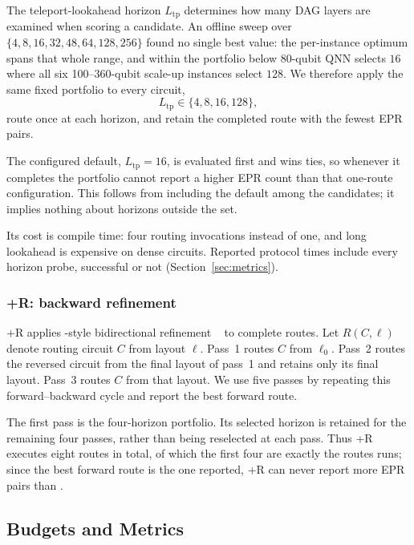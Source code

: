 The teleport-lookahead horizon $L_\mathrm{tp}$ determines how many DAG
layers are examined when scoring a \TeleData{} candidate. An offline sweep
over $\{4,8,16,32,48,64,128,256\}$ found no single best value: the
per-instance optimum spans that whole range, and within the portfolio below
80-qubit QNN selects $16$ where all six 100--360-qubit scale-up instances
select $128$. We therefore apply the same
fixed portfolio to every circuit,
\[
L_\mathrm{tp}\in\{4,8,16,128\},
\]
route once at each horizon, and retain the completed route with the fewest
EPR pairs.

The configured default, $L_\mathrm{tp}=16$, is evaluated first and wins
ties, so whenever it completes the portfolio cannot report a higher EPR
count than that one-route configuration. This follows from including the
default among the candidates; it implies nothing about horizons outside the
set.

Its cost is compile time: four routing invocations instead of one, and long
lookahead is expensive on dense circuits. Reported protocol times include
every horizon probe, successful or not (Section~\ref{sec:metrics}).

\subsubsection{\PORTER{}+R: backward refinement}
\label{sec:sfc-refine}

\PORTER{}+R applies \SABRE{}-style bidirectional refinement
~\cite{li2019tackling} to complete routes. Let $R(C,\ell)$ denote routing
circuit $C$ from layout $\ell$. Pass~1 routes $C$ from $\ell_0$. Pass~2
routes the reversed circuit from the final layout of pass~1 and retains only
its final layout. Pass~3 routes $C$ from that layout. We use five passes by
repeating this forward--backward cycle and report the best forward route.

The first pass is the four-horizon \PORTER{} portfolio. Its selected horizon
is retained for the remaining four passes, rather than being reselected at
each pass. Thus \PORTER{}+R executes eight routes in total, of which the first four
are exactly the routes \PORTER{} runs; since the best forward route is the
one reported, \PORTER{}+R can never report more EPR pairs than \PORTER{}.

\subsection{Budgets and Metrics}
\label{sec:budgets}
\label{sec:metrics}

